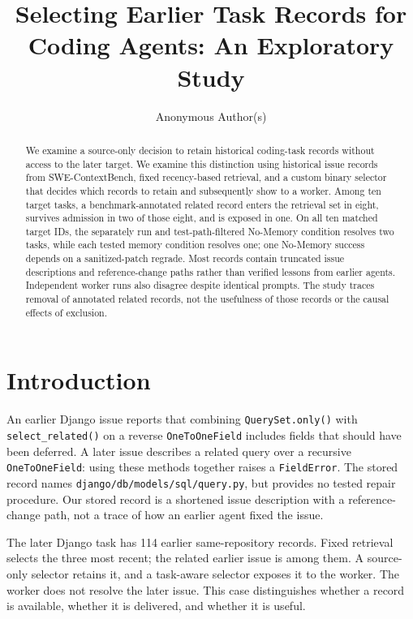 \documentclass[sigconf,anonymous]{aamas}
\title{Selecting Earlier Task Records for Coding Agents: An Exploratory Study}
\author{Anonymous Author(s)}
\affiliation{\institution{Anonymous}}
\begin{document}
\begin{abstract}
We examine a source-only decision to retain historical coding-task records without access to the later target. We examine this distinction using historical issue records from SWE-ContextBench, fixed recency-based retrieval, and a custom binary selector that decides which records to retain and subsequently show to a worker. Among ten target tasks, a benchmark-annotated related record enters the retrieval set in eight, survives admission in two of those eight, and is exposed in one. On all ten matched target IDs, the separately run and test-path-filtered No-Memory condition resolves two tasks, while each tested memory condition resolves one; one No-Memory success depends on a sanitized-patch regrade. Most records contain truncated issue descriptions and reference-change paths rather than verified lessons from earlier agents. Independent worker runs also disagree despite identical prompts. The study traces removal of annotated related records, not the usefulness of those records or the causal effects of exclusion.
\end{abstract}
\maketitle

\section{Introduction}
An earlier Django issue reports that combining \texttt{QuerySet.only()} with \texttt{select\_related()} on a reverse \texttt{OneToOneField} includes fields that should have been deferred. A later issue describes a related query over a recursive \texttt{OneToOneField}: using these methods together raises a \texttt{FieldError}. The stored record names \texttt{django/db/models/sql/query.py}, but provides no tested repair procedure. Our stored record is a shortened issue description with a reference-change path, not a trace of how an earlier agent fixed the issue.

The later Django task has 114 earlier same-repository records. Fixed retrieval selects the three most recent; the related earlier issue is among them. A source-only selector retains it, and a task-aware selector exposes it to the worker. The worker does not resolve the later issue. This case distinguishes whether a record is available, whether it is delivered, and whether it is useful.
\end{document}

